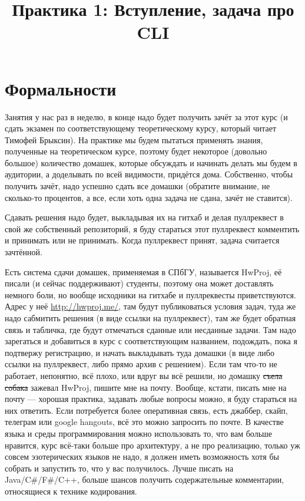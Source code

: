 \documentclass[a5paper]{article}
\title{Практика 1: Вступление, задача про CLI}
\date{}
\begin{document}
\maketitle
\thispagestyle{empty}

\section{Формальности}
Занятия у нас раз в неделю, в конце надо будет получить зачёт за этот курс (и сдать экзамен по соответствующему теоретическому курсу, который читает Тимофей Брыксин). На практике мы будем пытаться применять знания, полученные на теоретическом курсе, поэтому будет некоторое (довольно большое) количество домашек, которые обсуждать и начинать делать мы будем в аудитории, а доделывать по всей видимости, придётся дома. Собственно, чтобы получить зачёт, надо успешно сдать все домашки (обратите внимание, не сколько-то процентов, а все, если хоть одна задача не сдана, зачёт не ставится).

Сдавать решения надо будет, выкладывая их на гитхаб и делая пуллреквест в свой же собственный репозиторий, я буду стараться этот пуллреквест комментить и принимать или не принимать. Когда пуллреквест принят, задача считается зачтённой.

Есть система сдачи домашек, применяемая в СПбГУ, называется HwProj, её писали (и сейчас поддерживают) студенты, поэтому она может доставлять немного боли, но вообще исходники на гитхабе и пуллреквесты приветствуются. Адрес у неё \url{http://hwproj.me/}, там будут публиковаться условия задач, туда же надо сабмитить решения (в виде ссылки на пуллреквест), там же будет обратная связь и табличка, где будут отмечаться сданные или несданные задачи. Там надо зарегаться и добавиться в курс с соответствующим названием, подождать, пока я подтвержу регистрацию, и начать выкладывать туда домашки (в виде либо ссылки на пуллреквест, либо прямо архив с решением). Если там что-то не работает, непонятно, всё плохо, или вдруг вы всё решили, но домашку \sout{съела собака} зажевал HwProj, пишите мне на почту. Вообще, кстати, писать мне на почту --- хорошая практика, задавать любые вопросы можно, я буду стараться на них ответить. Если потребуется более оперативная связь, есть джаббер, скайп, телеграм или google hangouts, всё это можно запросить по почте. В качестве языка и среды программирования можно использовать то, что вам больше нравится, курс всё-таки больше про архитектуру, а не про реализацию, только уж совсем эзотерических языков не надо, я должен иметь возможность хотя бы собрать и запустить то, что у вас получилось. Лучше писать на Java/C\#/F\#/C++, больше шансов получить содержательные комментарии, относящиеся к технике кодирования.
\end{document}
